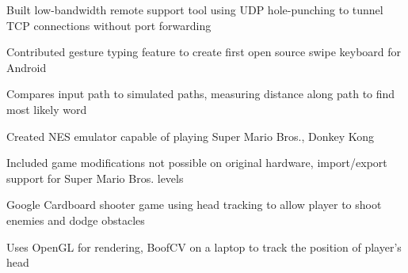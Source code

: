 \documentclass[12pt]{jmichaud-resume}
\begin{document}
 \hfill {}
\begin{tightemize}
	\item Built low-bandwidth remote support tool using UDP hole-punching to tunnel TCP connections without port forwarding
\end{tightemize}
\sectionsep

 \hfill {}

\sectionsepp

 \hfill
{}
\begin{tightemize}
	\item Contributed gesture typing feature to create first open source swipe keyboard for Android
	\item Compares input path to simulated paths, measuring distance along path to find most likely word
\end{tightemize}

\sectionsep

 \hfill
{}
\begin{tightemize}
	\item Created NES emulator capable of playing Super Mario Bros., Donkey Kong
	\item Included game modifications not possible on original hardware, import/export support for Super Mario Bros. levels
\end{tightemize}

\sectionsep
\iffalse
\runsubsection{GlideN64 Contributor} \hfill
\location{C++, OpenGL}
\begin{tightemize}
	\item Contributed stereoscopic rendering support to GlideN64 Nintendo 64 graphics plugin
	\item After projection matrix is applied, "untransforms" vertices to apply eye translation, avoiding toe-in artifacts
\end{tightemize}
\sectionsep
\fi

\iftrue
{} \hfill
{}
\begin{tightemize}
	\item Google Cardboard shooter game using head tracking to allow player to shoot enemies and dodge obstacles
	\item Uses OpenGL for rendering, BoofCV on a laptop to track the position of player’s head
\end{tightemize}
\sectionsep
\fi
\end{document}
